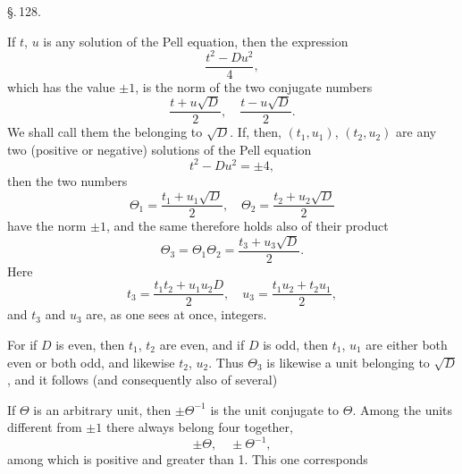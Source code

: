 \begin{center}
\S.\,128.

\end{center}

If $t$, $u$ is any solution of the Pell equation, then
the expression
\[
\frac{t^2 - D u^2}{4},
\]
which has the value $\pm 1$, is the norm of the two conjugate numbers
\[
\frac{t + u\sqrt{D}}{2}, \quad \frac{t - u\sqrt{D}}{2}.
\]
We shall call them the  belonging to $\sqrt{D}$.
If, then, $(t_1, u_1)$, $(t_2, u_2)$ are any two (positive or negative)
solutions of the Pell equation
\[
t^2 - D u^2 = \pm 4,
\]
then the two numbers
\[
\Theta_1 = \frac{t_1 + u_1 \sqrt{D}}{2}, \quad \Theta_2 = \frac{t_2 + u_2 \sqrt{D}}{2}
\]
have the norm $\pm 1$, and the same therefore holds also of their product
\[
\Theta_3 = \Theta_1 \Theta_2 = \frac{t_3 + u_3 \sqrt{D}}{2}.
\]
Here
\[
t_3 = \frac{t_1 t_2 + u_1 u_2 D}{2}, \quad u_3 = \frac{t_1 u_2 + t_2 u_1}{2},
\]
and $t_3$ and $u_3$ are, as one sees at once, integers.

For if $D$ is even, then $t_1$, $t_2$ are even, and if $D$
is odd, then $t_1$, $u_1$ are either both even or both
odd, and likewise $t_2$, $u_2$. Thus $\Theta_3$ is likewise a unit
belonging to $\sqrt{D}$, and it follows 
(and consequently also of several) 

If $\Theta$ is an arbitrary unit, then $\pm \Theta^{-1}$ is the unit conjugate
to $\Theta$. Among the units different from $\pm 1$
there always belong four together,
\[
\pm \Theta, \quad \pm \Theta^{-1},
\]
among which  is positive and greater than 1. This one corresponds
